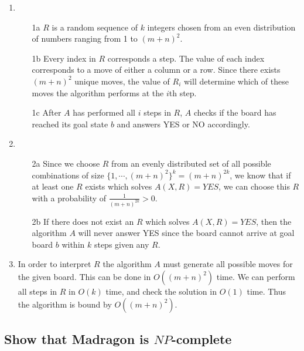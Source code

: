 \documentclass[12pt]{article}
\begin{document}
\begin{enumerate}
    \item
        \begin{enumerate}
            \item[1a] $R$ is a random sequence of $k$ integers chosen from an even distribution of numbers ranging from 1 to $(m+n)^2$.
            \item[1b] Every index in $R$ corresponds a step. The value of each index corresponds to a move of either a column or a row. Since there exists $(m+n)^2$ unique moves, the value of $R_i$ will determine which of these moves the algorithm performs at the $i$th step.
            \item[1c] After $A$ has performed all $i$ steps in $R$, $A$ checks if the board has reached its goal state $b$ and answers YES or NO accordingly.
        \end{enumerate}
    \item
        \begin{enumerate}
            \item[2a] Since we choose $R$ from an evenly distributed set of all possible combinations of size $\{1, \cdots, (m+n)^2\}^k = (m+n)^{2k}$, we know that if at least one $R$ exists which solves $A(X, R) = YES$, we can choose this $R$ with a probability of $\frac{1}{(m+n)^{2k}} > 0$.
            \item[2b] If there does not exist an $R$ which solves $A(X, R) = YES$, then the algorithm $A$ will never answer YES since the board cannot arrive at goal board $b$ within $k$ steps given any $R$.
        \end{enumerate}
    \item
        In order to interpret $R$ the algorithm $A$ must generate all possible moves for the given board. This can be done in $O((m+n)^2)$ time. We can perform all steps in $R$ in $O(k)$ time, and check the solution in $O(1)$ time.
        Thus the algorithm is bound by $O((m+n)^2)$.
\end{enumerate}

\subsection{Show that Madragon is $NP$-complete}
\label{sub:Show that Madragon is $NP$-complete}
\end{document}
